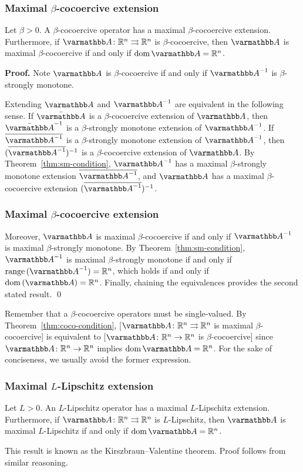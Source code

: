 \documentclass[10pt,mathserif]{beamer}
\begin{document}
\begin{frame}
\frametitle{Maximal $\beta$-cocoercive extension}
\begin{theorem}
\label{thm:coco-condition}
Let $\beta>0$.
A $\beta$-cocoercive operator has a maximal $\beta$-cocoercive extension.
Furthermore, if $\opA\colon\reals^n\rightrightarrows \reals^n$ is $\beta$-cocoercive, then $\opA$ is maximal $\beta$-cocoercive if and only if $\dom \opA=\reals^n$.
\end{theorem}
\textbf{Proof.}
Note $\opA$ is $\beta$-cocoercive if and only if $\opA^{-1}$ is $\beta$-strongly monotone.
\vspace{0.1in}

Extending $\opA$ and $\opA^{-1}$ are equivalent in the following sense.
If $\bar{\opA}$ is a $\beta$-cocoercive extension of $\opA$, then $\bar{\opA}^{-1}$ is a $\beta$-strongly monotone extension of $\opA^{-1}$.
If $\overline{\opA^{-1}}$ is a $\beta$-strongly monotone extension of $\opA^{-1}$, then $(\overline{\opA^{-1}})^{-1}$ is a $\beta$-cocoercive extension of $\opA$.
By Theorem~\ref{thm:sm-condition}, $\opA^{-1}$ has a maximal $\beta$-strongly monotone extension $\overline{\opA^{-1}}$, and $\opA$ has a maximal $\beta$-cocoercive extension $(\overline{\opA^{-1}})^{-1}$.

\end{frame}


\begin{frame}
\frametitle{Maximal $\beta$-cocoercive extension}
Moreover, $\opA$ is maximal $\beta$-cocoercive if and only if $\opA^{-1}$ is maximal $\beta$-strongly monotone.
By Theorem~\ref{thm:sm-condition}, $\opA^{-1}$ is maximal $\beta$-strongly monotone if and only if $\range (\opA^{-1})=\reals^n$, which holds if and only if $\dom (\opA)=\reals^n$.
Finally, chaining the equivalences provides the second stated result.
\qed
\vspace{0.2in}

Remember that a $\beta$-cocoercive operators must be single-valued.
By Theorem~\ref{thm:coco-condition}, [$\opA\colon\reals^n\rightrightarrows \reals^n$ is maximal $\beta$-cocoercive] is equivalent to [$\opA\colon\reals^n\rightarrow \reals^n$ is $\beta$-cocoercive] since $\opA\colon\reals^n\rightarrow \reals^n$ implies $\dom \opA=\reals^n$.
For the sake of conciseness, we usually avoid the former expression.
\end{frame}




\begin{frame}
\frametitle{Maximal $L$-Lipschitz extension}
\begin{theorem}
\label{thm:Lipschitz-condition}
Let $L>0$.
An $L$-Lipschitz operator has a maximal $L$-Lipschitz extension.
Furthermore, if $\opA\colon\reals^n\rightrightarrows \reals^n$ is $L$-Lipschitz, then $\opA$ is maximal $L$-Lipschitz if and only if $\dom \opA=\reals^n$.
\end{theorem}

\vspace{0.2in}
This result is known as the Kirszbraun--Valentine theorem. 
Proof follows from similar reasoning.

\end{frame}
\end{document}
